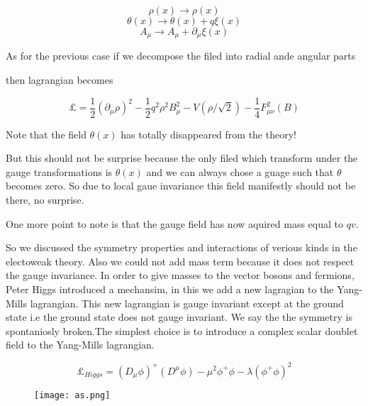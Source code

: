 \documentclass[12pt]{article}
\newcommand{\be}{\begin{equation}}
\newcommand{\ee}{\end{equation}}
\begin{document}
$$\rho(x) \rightarrow \rho(x)$$
$$\theta(x) \rightarrow \theta(x)+ q \xi(x)$$
$$A_{\mu} \rightarrow A_{\mu}+ \partial_{\mu} \xi(x)$$


As for the previous case if we decompose the filed into radial ande angular parts

then lagrangian becomes 

\be \pounds = \frac{1}{2}\left (\partial_{\mu} \rho \right)^{2} -\frac{1}{2} q^{2} \rho^{2} B_{\mu}^{2}-V(\rho/ \sqrt{2})-\frac{1}{4} F_{\mu \nu}^{2}(B)\ee

Note that the field $\theta(x)$ has totally disappeared from the theory!

But this should not be surprise because the only filed which transform under the gauge transformations is $\theta(x)$ and we can always chose a guage such that $\theta $ becomes zero. So due to local gaue invariance this field manifestly should not be there, no surprise. 

One more point to note is that the gauge field has now aquired mass equal to $qv$.



So we discussed the symmetry properties and interactions of verious kinds in the electoweak theory. Also we could not add mass term because it does not respect the gauge invariance. In order to give masses to the vector bosons and fermions, Peter Higgs introduced a mechansim, in this we add a new lagragian to the Yang-Mills lagrangian. This new lagrangian is gauge invariant except at the ground state i.e the ground state does not gauge invariant. We say the the symmetry is spontaniosly broken.The simplest choice is to introduce a complex scalar doublet field to the Yang-Mills lagrangian.

\be \pounds_{Higgs} =\left (D_{\mu} \phi\right)^{+} \left (D^{\mu}\phi\right)- \mu^{2} \phi^{+} \phi - \lambda \left(\phi^{+} \phi\right)^{2} \ee
\hskip50pt


\begin{figure}
\begin{center}
\texttt{[image: as.png]}
\end{center}
\end{figure}
\end{document}
